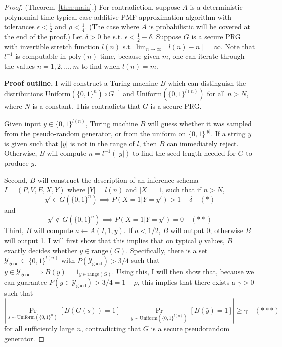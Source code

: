 \documentclass{article}
\def \Ygood{\mathcal{Y}_\text{good}}
\def \by{{\bar{y}}}
\theoremstyle{definition}
\theoremstyle{remark}
\begin{document}
\begin{proof}{(Theorem~\ref{thm:main}.)}
For contradiction, suppose $A$ is a deterministic polynomial-time typical-case additive PMF approximation algorithm with tolerances $\epsilon < \frac{1}{2}$ and $\rho < \frac{1}{4}$.
(The case where $A$ is probabilistic will be covered at the end of the proof.)
Let $\delta > 0$ be s.t. $\epsilon < \frac{1}{2} - \delta$.
Suppose $G$ is a secure PRG with invertible stretch function $l(n)$ s.t. $\lim_{n \to \infty} [l(n) - n] = \infty$.
Note that $l^{-1}$ is computable in $\text{poly}(n)$ time, because given $m$, one can iterate through the values $n = 1, 2, \dots, m$ to find when $l(n) = m$.

\medskip
\noindent \textbf{Proof outline.}
I will construct a Turing machine $B$ which can distinguish the distributions $\text{Uniform}(\{0, 1\}^n) \circ G^{-1}$ and $\text{Uniform}(\{0, 1\}^{l(n)})$ for all $n > N$, where $N$ is a constant.  This contradicts that $G$ is a secure PRG.

Given input $y \in \{0, 1\}^{l(n)}$,
Turing machine $B$ will guess whether it was sampled from the pseudo-random generator, or from the uniform on $\{0, 1\}^{|y|}$.
If a string $y$ is given such that $|y|$ is not in the range of $l$, then $B$ can immediately reject.
Otherwise, $B$ will compute $n = l^{-1}(|y|)$ to find the seed length needed for $G$ to produce $y$.

Second, $B$ will construct the description of an inference schema $I = (P, V, E, X, Y)$ where $|Y| = l(n)$ and $|X| = 1$, such that if $n > N$,
$$
y' \in G(\{0, 1\}^n) \implies P(X = 1 | Y = y') > 1 - \delta \quad (*)
$$
and
$$
y' \notin G(\{0, 1\}^n) \implies P(X = 1 | Y = y') = 0 \quad (**)
$$
Third, $B$ will compute $a \gets A(I, 1, y)$.
If $a < 1/2$, $B$ will output 0; otherwise $B$ will output 1.
I will first show that this implies that on typical $y$ values,
$B$ exactly decides whether $y \in \text{range}(G)$.
Specifically, there is a set $\Ygood \subseteq \{0, 1\}^{l(n)}$ with $P(\Ygood) > 3/4$ such that
$y \in \Ygood \implies B(y) = 1_{y \in \text{range}(G)}$.
Using this,
I will then show that, because we can guarantee $P(y \in \Ygood) > 3/4 = 1 - \rho$,
this implies that there exists a $\gamma > 0$ such that
$$
|\Pr_{s \sim \text{Uniform}(\{0, 1\}^n)}[B(G(s)) = 1] - \Pr_{\by \sim \text{Uniform}(\{0, 1\}^{l(n)})}[B(\by) = 1]| \geq \gamma \quad (***)
$$
for all sufficiently large $n$, contradicting that $G$ is a secure pseudorandom generator.


\end{proof}
\end{document}
